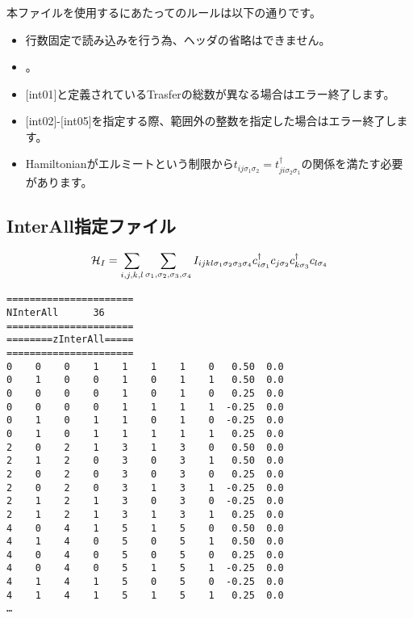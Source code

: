 \subsubsection{}
本ファイルを使用するにあたってのルールは以下の通りです。
\begin{itemize}
\item 行数固定で読み込みを行う為、ヘッダの省略はできません。
\item {}。
\item $[$int01$]$と定義されているTrasferの総数が異なる場合はエラー終了します。
\item $[$int02$]$-$[$int05$]$を指定する際、範囲外の整数を指定した場合はエラー終了します。
\item Hamiltonianがエルミートという制限から$t_{ij\sigma_1\sigma_2}=t_{ji\sigma_2\sigma_1}^{\dagger}$の関係を満たす必要があります。
\end{itemize}

\newpage
\subsection{InterAll指定ファイル}
\label{Subsec:interall}
\begin{equation}
{\cal H}_{I}=\sum_{i,j,k,l}\sum_{\sigma_1,\sigma_2, \sigma_3, \sigma_4}
I_{ijkl\sigma_1\sigma_2\sigma_3\sigma_4}c_{i\sigma_1}^{\dagger}c_{j\sigma_2}c_{k\sigma_3}^{\dagger}c_{l\sigma_4}
\end{equation}

\begin{minipage}{12.5cm}
\begin{screen}
\begin{verbatim}
====================== 
NInterAll      36  
====================== 
========zInterAll===== 
====================== 
0    0    0    1    1    1    1    0   0.50  0.0
0    1    0    0    1    0    1    1   0.50  0.0
0    0    0    0    1    0    1    0   0.25  0.0
0    0    0    0    1    1    1    1  -0.25  0.0
0    1    0    1    1    0    1    0  -0.25  0.0
0    1    0    1    1    1    1    1   0.25  0.0
2    0    2    1    3    1    3    0   0.50  0.0
2    1    2    0    3    0    3    1   0.50  0.0
2    0    2    0    3    0    3    0   0.25  0.0
2    0    2    0    3    1    3    1  -0.25  0.0
2    1    2    1    3    0    3    0  -0.25  0.0
2    1    2    1    3    1    3    1   0.25  0.0
4    0    4    1    5    1    5    0   0.50  0.0
4    1    4    0    5    0    5    1   0.50  0.0
4    0    4    0    5    0    5    0   0.25  0.0
4    0    4    0    5    1    5    1  -0.25  0.0
4    1    4    1    5    0    5    0  -0.25  0.0
4    1    4    1    5    1    5    1   0.25  0.0
…
\end{verbatim}
\end{screen}
\end{minipage}

